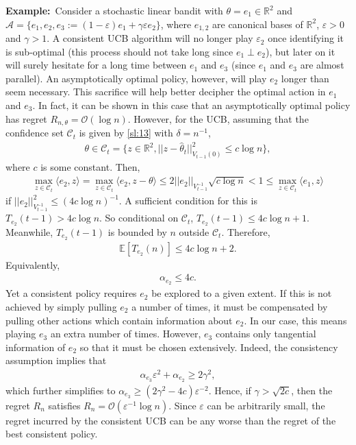 \documentclass[letterpaper,11pt,openright,openany]{book}
\numberwithin{equation}{section}
\theoremstyle{plain}
\theoremstyle{definition}
\def\R{{\mathbb R}}
\def\E{{\mathbb E}}
\def\R{{\mathbb R}}
\def\e{{\varepsilon}}
\def\t{{\theta}}
\begin{document}
\medskip

\textbf{Example:}\ 
Consider a stochastic linear bandit with $\t=e_1\in\R^2$ and $\mathcal A=\{e_1, e_2, e_3:=(1-\e)e_1+\gamma\e e_2\}$, where $e_{1,2}$ are canonical bases of $\R^2$, $\e>0$ and $\gamma>1$. A consistent UCB algorithm will no longer play $\e_2$ once identifying it is sub-optimal (this process should not take long since $e_1\perp e_2$), but later on it will surely hesitate for a long time between $e_1$ and $e_3$ (since $e_1$ and $e_3$ are almost parallel). An asymptotically optimal policy, however, will play $e_2$ longer than seem necessary. This sacrifice will help better decipher the optimal action in $e_1$ and $e_3$. In fact, it can be shown in this case that an asymptotically optimal policy has regret $R_{n,\t}=\mathcal O(\log n)$. However, for the UCB, assuming that the confidence set $\mathcal C_t$ is given by \eqref{sl:13} with $\delta = n^{-1}$, 
\begin{align*}
\t\in\mathcal C_t = \{z\in\R^2, ||z-\hat{\t}_t||^2_{V_{t-1}(0)}\leq c\log n\},
\end{align*}
where $c$ is some constant. Then,
\begin{align*}
\max_{z\in\mathcal C_t}\langle e_2, z\rangle=\max_{z\in\mathcal C_t}\langle e_2, z-\t\rangle\leq 2||e_2||_{V^{-1}_{t-1}}\sqrt{c\log n}< 1\leq \max_{z\in\mathcal C_t}\langle e_1, z\rangle 
\end{align*}
if $||e_2||^2_{V_{t-1}^{-1}}\leq (4c\log n)^{-1}$. A sufficient condition for this is $T_{e_2}(t-1)> 4c\log n$. So conditional on $\mathcal C_t$, $T_{e_2}(t-1)\leq 4c\log n + 1$. Meanwhile, $T_{e_2}(t-1)$ is bounded by $n$ outside $\mathcal C_t$. Therefore,  
\begin{align*}
\E[T_{e_2}(n)]\leq 4c\log n + 2. 
\end{align*}
Equivalently, 
\begin{align*}
\alpha_{e_2}\leq 4c. 
\end{align*}
Yet a consistent policy requires $e_2$ be explored to a given extent. If this is not achieved by simply pulling $e_2$ a number of times,  it must be compensated by pulling other actions which contain information about $e_2$. In our case, this means playing $e_3$ an extra number of times. However, $e_3$ contains only tangential information of $e_2$ so that it must be chosen extensively. Indeed, the consistency assumption implies that 
\begin{align*}
\alpha_{e_3}\e^2+\alpha_{e_2}\geq  2\gamma^2, 
\end{align*}
which further simplifies to $\alpha_{e_3}\geq (2\gamma^2-4c)\e^{-2}$. Hence, if $\gamma>\sqrt{2c}$, then the regret $R_n$ satisfies $R_n = \mathcal O(\e^{-1}\log n)$. Since $\e$ can be arbitrarily small, the regret incurred by the consistent UCB can be any worse than the regret of the best consistent policy. 
\end{document}
